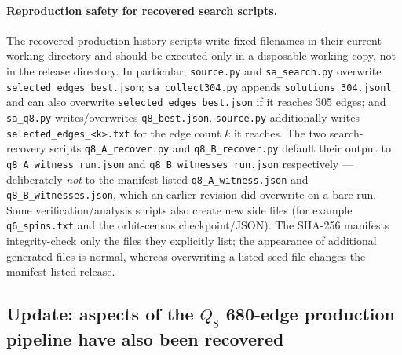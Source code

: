 \documentclass[12pt]{article}
\begin{document}
\paragraph{Reproduction safety for recovered search scripts.}
The recovered production-history scripts write fixed filenames in their
current working directory and should be executed only in a disposable working
copy, not in the release directory. In particular, \texttt{source.py} and
\texttt{sa\_search.py} overwrite \texttt{selected\_edges\_best.json};
\texttt{sa\_collect304.py} appends \texttt{solutions\_304.jsonl} and can
also overwrite \texttt{selected\_edges\_best.json} if it reaches 305 edges;
and \texttt{sa\_q8.py} writes/overwrites \texttt{q8\_best.json}.
\texttt{source.py} additionally writes \texttt{selected\_edges\_<k>.txt} for
the edge count $k$ it reaches. The two search-recovery scripts
\texttt{q8\_A\_recover.py} and \texttt{q8\_B\_recover.py} default their output
to \texttt{q8\_A\_witness\_run.json} and \texttt{q8\_B\_witnesses\_run.json}
respectively --- deliberately \emph{not} to the manifest-listed
\texttt{q8\_A\_witness.json} and \texttt{q8\_B\_witnesses.json}, which an
earlier revision did overwrite on a bare run. Some
verification/analysis scripts also create new side files (for example
\texttt{q6\_spins.txt} and the orbit-census checkpoint/JSON). The SHA-256
manifests integrity-check only the files they explicitly list; the appearance of
additional generated files is normal, whereas overwriting a listed seed file
changes the manifest-listed release.

\subsection{Update: aspects of the \texorpdfstring{$Q_8$}{Q8} 680-edge production pipeline have also been recovered}
\end{document}
